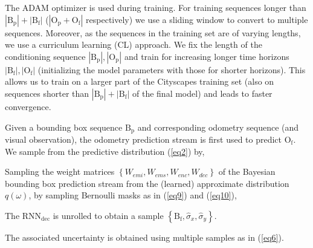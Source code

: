 The ADAM optimizer \cite{kingma2014adam} is used during training. For training sequences longer than $| \text{B}_{\text{p}}| + | \text{B}_{\text{f}}|$ ($| \text{O}_{\text{p}} + \text{O}_{\text{f}}|$ respectively) we use a sliding window to convert to multiple sequences. Moreover, as the sequences in the training set are of varying lengths, 
we use a curriculum learning (CL) approach. We fix the length of the conditioning sequence $| \text{B}_{\text{p}}|,| \text{O}_{\text{p}}|$ and train for increasing longer time horizons $| \text{B}_{\text{f}}|,| \text{O}_{\text{f}}|$ (initializing the model parameters with those for shorter horizons). This allows us to train on a larger part of the Cityscapes training set (also on sequences shorter than $| \text{B}_{\text{p}}| + | \text{B}_{\text{f}}|$ of the final model) and leads to faster convergence.

 Given a bounding box sequence $\text{B}_{\text{p}}$ and corresponding odometry sequence (and visual observation), the odometry prediction stream is first used to predict $\text{O}_{\text{f}}$. We sample from the predictive distribution (\ref{eq2}) by, 
\begin{enumerate*}
\item Sampling the weight matrices $\left\{ W_{emi}, W_{ems}, W_{enc}, W_{dec} \right\}$ of the Bayesian bounding box prediction stream from the (learned) approximate distribution $q(\omega)$, by sampling Bernoulli masks as in (\ref{eq9}) and (\ref{eq10}),
\item The $\text{RNN}_{\text{dec}}$ is unrolled to obtain a sample $\left\{ \text{B}_{\text{f}}, \hat{\sigma}_{x}, \hat{\sigma}_{y} \right\}$.
\end{enumerate*}
The associated uncertainty is obtained using multiple samples as in (\ref{eq6}).